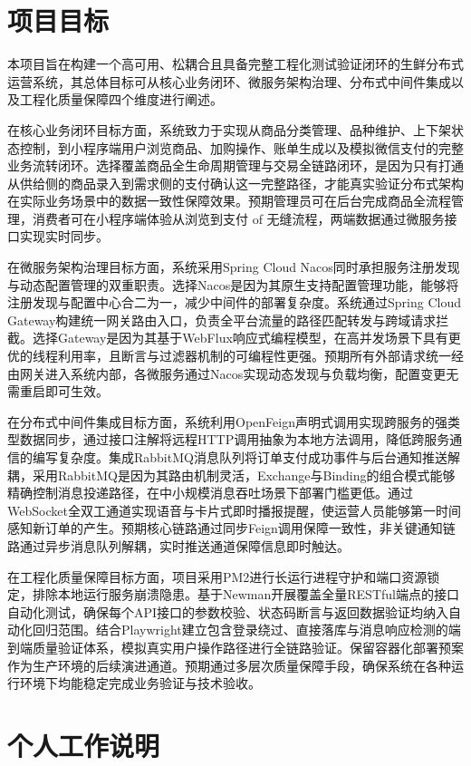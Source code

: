\section{项目目标}

本项目旨在构建一个高可用、松耦合且具备完整工程化测试验证闭环的生鲜分布式运营系统，其总体目标可从核心业务闭环、微服务架构治理、分布式中间件集成以及工程化质量保障四个维度进行阐述。

在核心业务闭环目标方面，系统致力于实现从商品分类管理、品种维护、上下架状态控制，到小程序端用户浏览商品、加购操作、账单生成以及模拟微信支付的完整业务流转闭环。选择覆盖商品全生命周期管理与交易全链路闭环，是因为只有打通从供给侧的商品录入到需求侧的支付确认这一完整路径，才能真实验证分布式架构在实际业务场景中的数据一致性保障效果。预期管理员可在后台完成商品全流程管理，消费者可在小程序端体验从浏览到支付 of 无缝流程，两端数据通过微服务接口实现实时同步。

在微服务架构治理目标方面，系统采用Spring Cloud Nacos同时承担服务注册发现与动态配置管理的双重职责。选择Nacos是因为其原生支持配置管理功能，能够将注册发现与配置中心合二为一，减少中间件的部署复杂度。系统通过Spring Cloud Gateway构建统一网关路由入口，负责全平台流量的路径匹配转发与跨域请求拦截。选择Gateway是因为其基于WebFlux响应式编程模型，在高并发场景下具有更优的线程利用率，且断言与过滤器机制的可编程性更强。预期所有外部请求统一经由网关进入系统内部，各微服务通过Nacos实现动态发现与负载均衡，配置变更无需重启即可生效。

在分布式中间件集成目标方面，系统利用OpenFeign声明式调用实现跨服务的强类型数据同步，通过接口注解将远程HTTP调用抽象为本地方法调用，降低跨服务通信的编写复杂度。集成RabbitMQ消息队列将订单支付成功事件与后台通知推送解耦，采用RabbitMQ是因为其路由机制灵活，Exchange与Binding的组合模式能够精确控制消息投递路径，在中小规模消息吞吐场景下部署门槛更低。通过WebSocket全双工通道实现语音与卡片式即时播报提醒，使运营人员能够第一时间感知新订单的产生。预期核心链路通过同步Feign调用保障一致性，非关键通知链路通过异步消息队列解耦，实时推送通道保障信息即时触达。

在工程化质量保障目标方面，项目采用PM2进行长运行进程守护和端口资源锁定，排除本地运行服务崩溃隐患。基于Newman开展覆盖全量RESTful端点的接口自动化测试，确保每个API接口的参数校验、状态码断言与返回数据验证均纳入自动化回归范围。结合Playwright建立包含登录绕过、直接落库与消息响应检测的端到端质量验证体系，模拟真实用户操作路径进行全链路验证。保留容器化部署预案作为生产环境的后续演进通道。预期通过多层次质量保障手段，确保系统在各种运行环境下均能稳定完成业务验证与技术验收。

\section{个人工作说明}

